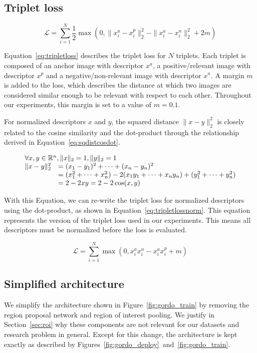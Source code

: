 \subsection{Triplet loss}\label{sec:tripletloss}
\begin{equation}\label{eq:tripletloss}
\mathcal{L} = \sum_{i=1}^N \frac{1}{2}
\max(0, \|x^a_i - x^p_i\|_2^2 - \|x^a_i - x^n_i\|_2^2 + 2m)
\end{equation}

Equation~\ref{eq:tripletloss} describes the triplet loss for $N$
triplets. Each triplet is composed of an anchor image with descriptor
$x^a$, a positive/relevant image with descriptor $x^p$ and a
negative/non-relevant image with descriptor $x^n$. A margin $m$ is added
to the loss, which describes the distance at which two images are
considered similar enough to be relevant with respect to each other.
Throughout our experiments, this margin is set to a value of $m=0.1$.

For normalized descriptors $x$ and $y$, the squared distance $\| x - y \|_2^2$
is closely related to the cosine similarity and the dot-product through
the relationship derived in Equation~\ref{eq:sqdistcosdot}.

\begin{equation}\label{eq:sqdistcosdot}
\begin{array}{ll}
\multicolumn{2}{l}{\forall x, y \in \mathbb{R}^n, \|x\|_2 = 1, \|y\|_2 = 1}\\
\|x-y\|_2^2 &= (x_1-y_1)^2 + \dots + (x_n-y_n)^2\\
&=(x_1^2 + \dots + x_n^2) - 2(x_1y_1 + \dots + x_ny_n) +
(y_1^2 + \dots + y_n^2)\\
&=2 - 2xy = 2 - 2\cos(x, y)
\end{array}
\end{equation}

With this Equation, we can re-write the triplet loss for normalized descriptors
using the dot-product, as shown in Equation~\ref{eq:tripletlossnorm}.
This equation represents the version of the triplet loss used in
our experiments. This means all descriptors must be normalized before
the loss is evaluated.

\begin{equation}\label{eq:tripletlossnorm}
\mathcal{L} = \sum_{i=1}^N
\max(0, x^a_i x^n_i - x^a_i x^p_i + m)
\end{equation}

\subsection{Simplified architecture}
We simplify the architecture shown in Figure~\ref{fig:gordo_train}
by removing the region proposal network and region of interest pooling.
We justify in Section~\ref{sec:roi} why these components are not
relevant for our datasets and research problem in general.
Except for this change, the architecture is kept exactly as described
by Figures~\ref{fig:gordo_deploy}~and~\ref{fig:gordo_train}.

